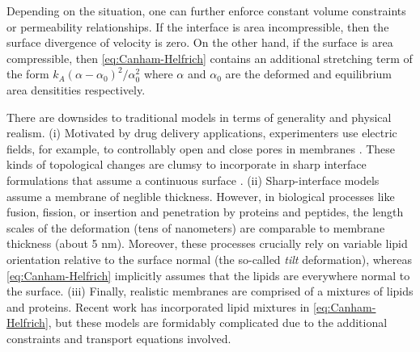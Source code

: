 Depending on the situation,
one can further enforce constant volume constraints or permeability relationships.
If the interface is area incompressible, then the surface divergence
of velocity is zero.  On the other hand, if the surface is area compressible,
then \eqref{eq:Canham-Helfrich} contains an additional stretching term of the
form $k_A(\alpha - \alpha_0)^2/\alpha_0^2$ where $\alpha$ and $\alpha_0$ are the
deformed and equilibrium area densitities respectively. 

There are downsides to traditional models in terms of generality and physical realism.
(i) Motivated by drug delivery applications, experimenters use electric
fields, for example, to controllably open and close pores in membranes
\cite{}.
These kinds of topological changes are clumsy to incorporate in
sharp interface formulations that assume a continuous surface \cite{}.
(ii) Sharp-interface models assume a membrane of neglible thickness. 
However, in biological processes
like fusion, fission, or insertion and penetration by proteins and peptides, 
the length scales of the
deformation (tens of nanometers) are comparable to membrane thickness (about 5 nm).
Moreover, these processes crucially rely on variable lipid
orientation relative to the surface normal (the so-called \emph{tilt}
deformation),
whereas \eqref{eq:Canham-Helfrich} implicitly assumes that the lipids
are everywhere normal to the surface.  
(iii) Finally, realistic membranes are comprised of a mixtures of lipids and proteins.
Recent work \cite{} has incorporated lipid mixtures in \eqref{eq:Canham-Helfrich},
but these models are formidably complicated 
due to the additional constraints and transport equations involved.

